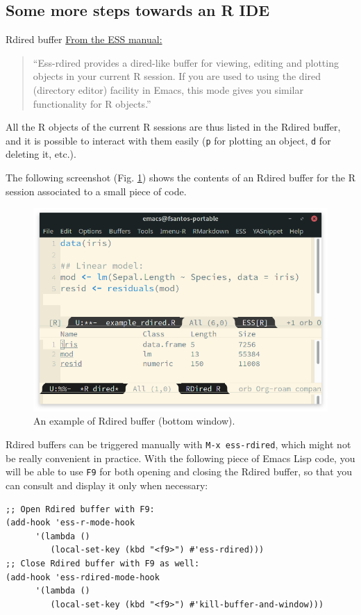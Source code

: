 \documentclass[presentation]{beamer}
\begin{document}
\subsection{Some more steps towards an R IDE}
\label{sec:org8443c82}
\begin{frame}[fragile,allowframebreaks,label=]{Rdired buffer}
 \href{http://ess.r-project.org/Manual/ess.html\#Rdired}{From the ESS manual:}

\begin{quote}
``Ess-rdired provides a dired-like buffer for viewing, editing and plotting objects in your current R session. If you are used to using the dired (directory editor) facility in Emacs, this mode gives you similar functionality for R objects.''
\end{quote}

All the R objects of the current R sessions are thus listed in the Rdired buffer, and it is possible to interact with them easily (\texttt{p} for plotting an object, \texttt{d} for deleting it, etc.).

The following screenshot (Fig. \ref{fig:org6f99c40}) shows the contents of an Rdired buffer for the R session associated to a small piece of code.

\begin{figure}[htbp]
\centering
\includegraphics[width=0.65 \textwidth]{./images/rdired.png}
\caption{\label{fig:org6f99c40}An example of Rdired buffer (bottom window).}
\end{figure}

\pagebreak

Rdired buffers can be triggered manually with \texttt{M-x ess-rdired}, which might not be really convenient in practice. With the following piece of Emacs Lisp code, you will be able to use \texttt{F9} for both opening and closing the Rdired buffer, so that you can consult and display it only when necessary:

\begin{verbatim}
;; Open Rdired buffer with F9:
(add-hook 'ess-r-mode-hook
	  '(lambda ()
	     (local-set-key (kbd "<f9>") #'ess-rdired)))
;; Close Rdired buffer with F9 as well:
(add-hook 'ess-rdired-mode-hook
	  '(lambda ()
	     (local-set-key (kbd "<f9>") #'kill-buffer-and-window)))
\end{verbatim}
\end{frame}
\end{document}
